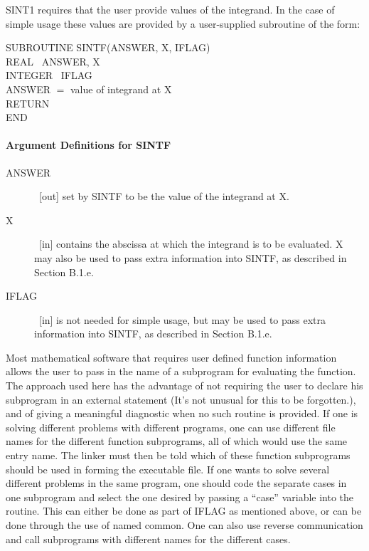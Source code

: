 \documentclass[twoside]{MATH77}
\begin{document}
SINT1 requires that the user provide values of the integrand. In the case
of simple usage these values are provided by a user-supplied subroutine of
the form:

{\tt \begin{tabbing}
SUBROUTINE SINTF(ANSWER, X, IFLAG)\\
REAL \ ANSWER, X\\
INTEGER \ IFLAG\\
ANSWER $=$ value of integrand at X\\
RETURN\\
END
\end{tabbing}}

\paragraph{Argument Definitions for SINTF\label{ArgSINTF}}

\begin{description}
\item[ANSWER]  \ [out] set by SINTF to be the value of the integrand at X.

\item[X]  \ [in] contains the abscissa at which the integrand is to be
evaluated. X may also be used to pass extra information into SINTF, as
described in Section B.1.e.

\item[IFLAG]  \ [in] is not needed for simple usage, but may be used to pass
extra information into SINTF, as described in Section B.1.e.
\end{description}

Most mathematical software that requires user defined function
information allows the user to pass in the name of a subprogram for
evaluating the function.  The approach used here has the advantage of not
requiring the user to declare his subprogram in an external statement
(It's not unusual for this to be forgotten.), and of giving a meaningful
diagnostic when no such routine is provided.  If one is solving different
problems with different programs, one can use different file names for the
different function subprograms, all of which would use the same entry
name.  The linker must then be told which of these function subprograms
should be used in forming the executable file.  If one wants to solve
several different problems in the same program, one should code the
separate cases in one subprogram and select the one desired by passing a
``case'' variable into the routine.  This can either be done as part of
IFLAG as mentioned above, or can be done through the use of named
common.  One can also use reverse communication and call subprograms with
different names for the different cases.
\end{document}
